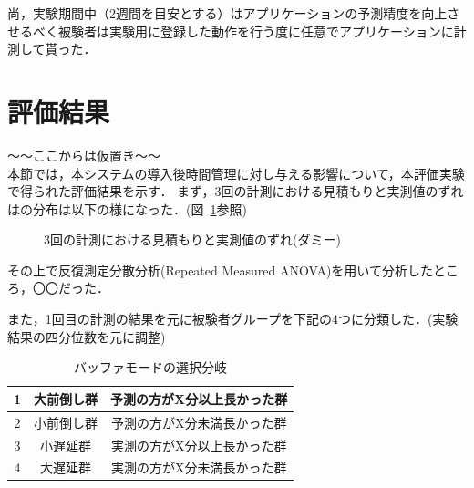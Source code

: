尚，実験期間中（2週間を目安とする）はアプリケーションの予測精度を向上させるべく被験者は実験用に登録した動作を行う度に任意でアプリケーションに計測して貰った．

\section{評価結果}
〜〜ここからは仮置き〜〜\\
本節では，本システムの導入後時間管理に対し与える影響について，本評価実験で得られた評価結果を示す．
まず，3回の計測における見積もりと実測値のずれはの分布は以下の様になった．(図~\ref{fig:hakohige}参照)

\begin{figure}[hb]
	\begin{center}
	\caption{3回の計測における見積もりと実測値のずれ(ダミー)}
	\label{fig:hakohige}
	\end{center}
\end{figure}

その上で反復測定分散分析(Repeated Measured ANOVA)を用いて分析したところ，〇〇だった．

また，1回目の計測の結果を元に被験者グループを下記の4つに分類した．(実験結果の四分位数を元に調整)

\begin{table}[htb]
  \begin{center}
  \begin{tabular}{|c|c|c|} \hline
    1 & 大前倒し群 & 予測の方がX分以上長かった群  \\ \hline
    2 & 小前倒し群 & 予測の方がX分未満長かった群  \\ \hline
    3 & 小遅延群 & 実測の方がX分以上長かった群  \\ \hline
    4 & 大遅延群 & 実測の方がX分未満長かった群  \\ \hline 
  \end{tabular}
    \caption{バッファモードの選択分岐}
    \label{tb:buffer}
  \end{center}
\end{table}

